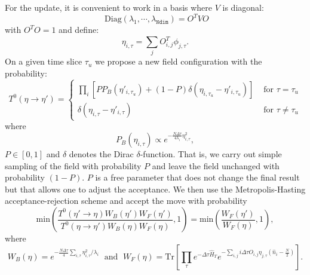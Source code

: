 For the update, it is convenient to  work in a basis where $V$ is diagonal:
\begin{equation}
	\text{ Diag}  \left( \lambda_1, \cdots ,\lambda_{\texttt{Ndim}} \right)    =  O^{T} V O 
\end{equation}
 with $O^T O = 1$  and define:
 \begin{equation}
 	  \eta_{i,\tau}^{\phantom\dagger}   =  \sum_{j} O^{T}_{i,j} \phi_{j,\tau}^{\phantom\dagger}.
 \end{equation}
 On a given time slice $\tau_u$ we propose a  new field configuration with the probability: 
 \begin{equation}
 	T^{0} ( \eta  \rightarrow  \eta' ) = 
	\left\{ 
	\begin{array}{ll} 
	  \prod_{i} \left[  P P_B(\eta'_{i,\tau_u})  + (1-P) \delta( \eta_{i,\tau_u} - \eta'_{i,\tau_u})   \right]  & \text{  for  } \tau = \tau_u \\
	  \delta( \eta_{i,\tau} - \eta'_{i,\tau})   & \text{  for  } \tau \neq \tau_u 
	  \end{array}
	  \right.
 \end{equation}
 where 
 \begin{equation}
 	 P_B(\eta_{i,\tau})   \propto e^{ - \frac{N \Delta \tau} {4 \lambda_i}  \eta_{i,\tau}^2 },
 \end{equation}
$ P \in \left[0,1 \right] $ and $\delta $ denotes the Dirac $\delta$-function.    That is, we  carry out  simple sampling of the field with probability $P$  and leave the field unchanged with probability 
$(1-P)$.  $P$ is a free parameter that   does not change the final result but that allows one to adjust the acceptance.    We then use  the Metropolis-Hasting    acceptance-rejection  scheme   and accept the move  with probability 
\begin{equation}
   \text{min} \left(     \frac{T^{0} ( \eta'  \rightarrow \eta ) W_B(\eta') W_F(\eta')  }{ T^{0} ( \eta \rightarrow \eta' ) W_B(\eta) W_F(\eta) } , 1 \right)     = \text{min} \left(     \frac{W_F(\eta')  }{ W_F(\eta) } , 1 \right),
\end{equation}
where 
\begin{equation}
  W_B(\eta)  = e^{ - \frac{N \Delta \tau} {4 } \sum_{i,\tau} \eta_{i,\tau}^2/\lambda_i } 
  \;\text{ and }\;
  W_F(\eta)  = \text{Tr} \left[   \prod_{\tau}   
     e^{-\Delta \tau \hat{H}_T}  e^{- \sum_{i,j}  i \Delta \tau O_{i,j}\eta_{j,\tau} \left( \hat{n}_{i} - \frac{N}{2} \right) }\right].
\end{equation}


